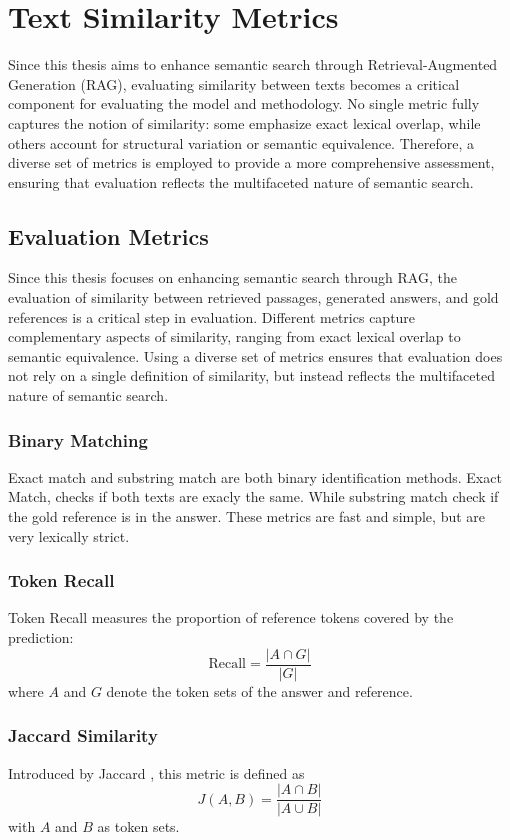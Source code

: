 \section{Text Similarity Metrics}
\label{sec:text-similarity-metrics}
Since this thesis aims to enhance semantic search through Retrieval-Augmented Generation (\gls{RAG}), 
evaluating similarity between texts becomes a critical component for evaluating the model and methodology. 
No single metric fully captures the notion of similarity: some emphasize exact lexical overlap, 
while others account for structural variation or semantic equivalence. 
Therefore, a diverse set of metrics is employed to provide a more comprehensive assessment, 
ensuring that evaluation reflects the multifaceted nature of semantic search.

\subsection{Evaluation Metrics}

Since this thesis focuses on enhancing semantic search through \gls{RAG}, the evaluation of similarity between retrieved passages, generated answers, and gold references is a critical step in evaluation. Different metrics capture complementary aspects of similarity, ranging from exact lexical overlap to semantic equivalence. Using a diverse set of metrics ensures that evaluation does not rely on a single definition of similarity, but instead reflects the multifaceted nature of semantic search.
\subsubsection{Binary Matching}
Exact match and substring match are both binary identification methods. Exact Match, checks if both texts are exacly the same. While substring match check if the gold reference is in the answer. These metrics are fast and simple, but are very lexically strict.

\subsubsection{Token Recall} 
Token Recall measures the proportion of reference tokens covered by the prediction:
\[
\text{Recall} = \frac{|A \cap G|}{|G|}
\]
where \(A\) and \(G\) denote the token sets of the answer and reference.  

\subsubsection{Jaccard Similarity} 
Introduced by Jaccard \cite{jaccard1901distribution}, this metric is defined as
\[
J(A,B) = \frac{|A \cap B|}{|A \cup B|}
\]
with \(A\) and \(B\) as token sets.  

